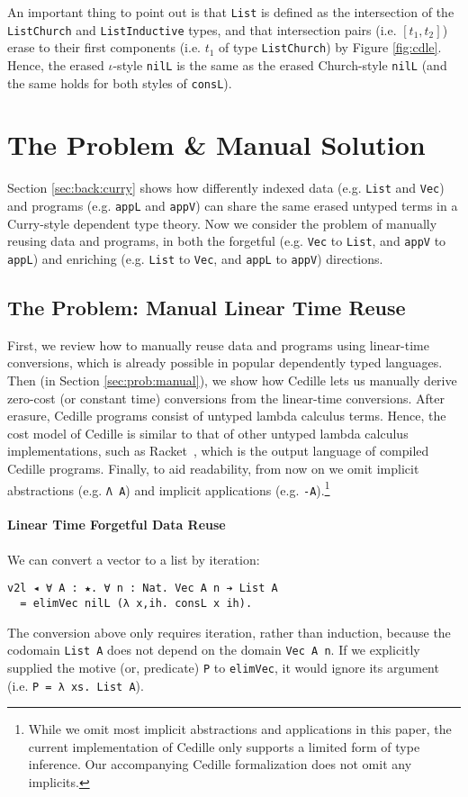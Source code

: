 \documentclass[acmsmall,screen]{acmart}
\newcommand{\refsec}[1]{Section \ref{sec:#1}}
\newcommand{\labsec}[1]{\label{sec:#1}}
\newcommand{\reffig}[1]{Figure \ref{fig:#1}}
\begin{document}
An important thing to point out is that \verb;List; is
defined as the intersection of the \verb;ListChurch; and
\verb;ListInductive; types, and that intersection pairs (i.e. $[t_1,t_2]$) erase to their
first components (i.e. $t_1$ of type \verb;ListChurch;) by \reffig{cdle}.
Hence, the erased $\iota$-style \verb;nilL; is the same as the erased
Church-style \verb;nilL; (and the same holds for both styles of
\verb;consL;).

\section{The Problem \& Manual Solution}
\labsec{prob}

\refsec{back:curry} shows how differently indexed data
(e.g. \verb;List; and \verb;Vec;) and programs
(e.g. \verb;appL; and \verb;appV;) can share the same erased
untyped terms in a Curry-style dependent type theory. 
Now we consider the problem of manually reusing data and programs,
in both the forgetful (e.g. \verb;Vec; to \verb;List;, and
\verb;appV; to \verb;appL;) and enriching
(e.g. \verb;List; to \verb;Vec;, and
\verb;appL; to \verb;appV;) directions.

\subsection{The Problem: Manual Linear Time Reuse}
\labsec{prob:linear}

First, we review how to manually reuse data and programs using
linear-time conversions, which is already possible in popular dependently
typed languages. Then (in \refsec{prob:manual}),
we show how Cedille lets us manually derive
zero-cost (or constant time) conversions from the linear-time
conversions. 
After erasure, Cedille programs consist of untyped
lambda calculus terms. Hence, the cost model of Cedille is similar to
that of other untyped lambda calculus implementations, such as
Racket~\cite{lang:racket}, which is the output language of compiled
Cedille programs.
Finally, to aid readability, from now on we omit implicit
abstractions (e.g. \verb;Λ A;) and implicit applications
(e.g. \verb;-A;).\footnote{
  While we omit most implicit abstractions and applications in this
  paper, the current implementation of Cedille only supports a limited
  form of type inference. Our accompanying Cedille formalization does
  not omit any implicits.
  }

\paragraph{Linear Time Forgetful Data Reuse}
We can convert a vector to a list by iteration:
\begin{verbatim}
v2l ◂ ∀ A : ★. ∀ n : Nat. Vec A n ➔ List A
  = elimVec nilL (λ x,ih. consL x ih).
\end{verbatim}
The conversion above only requires iteration, rather than induction,
because the codomain \verb;List A; does not depend on the domain
\verb;Vec A n;. If we explicitly supplied the motive (or, predicate)
\verb;P; to \verb;elimVec;, it would ignore its argument
(i.e. \verb;P = λ xs. List A;).
\end{document}
